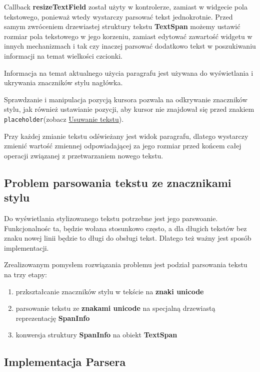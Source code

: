 Callback \textbf{resizeTextField} został użyty w kontrolerze, zamiast w widgecie pola tekstowego, ponieważ wtedy wystarczy parsować tekst jednokrotnie. Przed samym zwróceniem drzewiastej struktury tekstu \textbf{TextSpan} możemy ustawić rozmiar pola tekstowego w jego korzeniu, zamiast edytować zawartość widgetu w innych mechanizmach i tak czy inaczej parsować dodatkowo tekst w poszukiwaniu informacji na temat wielkości czcionki.

Informacja na temat aktualnego użycia paragrafu jest używana do wyświetlania i ukrywania znaczników stylu nagłówka.

Sprawdzanie i manipulacja pozycją kursora pozwala na odkrywanie znaczników stylu, jak również ustawianie pozycji, aby kursor nie znajdował się przed znakiem \verb|placeholder|(zobacz \hyperref[eq:usuwanieTekstu]{Usuwanie tekstu}).

Przy każdej zmianie tekstu odświeżany jest widok paragrafu, dlatego wystarczy zmienić wartość zmiennej odpowiadającej za jego rozmiar przed końcem całej operacji związanej z przetwarzaniem nowego tekstu.

\subsection{Problem parsowania tekstu ze znacznikami stylu}

Do wyświetlania stylizowanego tekstu potrzebne jest jego parswoanie. Funkcjonalnośc ta, będzie wołana stosunkowo często, a dla długich tekstów bez znaku nowej linii będzie to długi do obsługi tekst. Dlatego też ważny jest sposób implementacji.

Zrealizowanym pomysłem rozwiązania problemu jest podział parsowania tekstu na trzy etapy:
\begin{enumerate}
    \setlength\itemsep{0mm}
    \item przkształcanie znaczników stylu w tekście na \textbf{znaki unicode}
    \item parsowanie tekstu ze \textbf{znakami unicode} na specjalną drzewiastą reprezentację \textbf{SpanInfo}
    \item konwersja struktury \textbf{SpanInfo} na obiekt \textbf{TextSpan}
\end{enumerate}

\subsection{Implementacja Parsera}

